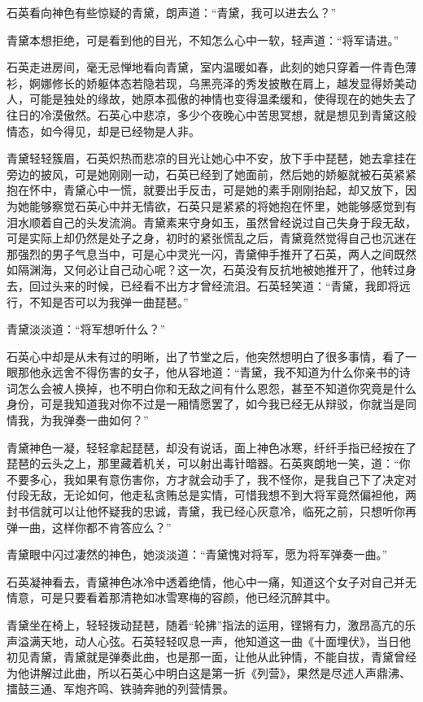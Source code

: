 石英看向神色有些惊疑的青黛，朗声道：“青黛，我可以进去么？”

青黛本想拒绝，可是看到他的目光，不知怎么心中一软，轻声道：“将军请进。”

石英走进房间，毫无忌惮地看向青黛，室内温暖如春，此刻的她只穿着一件青色薄衫，婀娜修长的娇躯体态若隐若现，乌黑亮泽的秀发披散在肩上，越发显得娇美动人，可能是独处的缘故，她原本孤傲的神情也变得温柔缓和，使得现在的她失去了往日的冷漠傲然。石英心中悲凉，多少个夜晚心中苦思冥想，就是想见到青黛这般情态，如今得见，却是已经物是人非。

青黛轻轻簇眉，石英炽热而悲凉的目光让她心中不安，放下手中琵琶，她去拿挂在旁边的披风，可是她刚刚一动，石英已经到了她面前，然后她的娇躯就被石英紧紧抱在怀中，青黛心中一慌，就要出手反击，可是她的素手刚刚抬起，却又放下，因为她能够察觉石英心中并无情欲，石英只是紧紧的将她抱在怀里，她能够感觉到有泪水顺着自己的头发流淌。青黛素来守身如玉，虽然曾经说过自己失身于段无敌，可是实际上却仍然是处子之身，初时的紧张慌乱之后，青黛竟然觉得自己也沉迷在那强烈的男子气息当中，可是心中灵光一闪，青黛伸手推开了石英，两人之间既然如隔渊海，又何必让自己动心呢？这一次，石英没有反抗地被她推开了，他转过身去，回过头来的时候，已经看不出方才曾经流泪。石英轻笑道：“青黛，我即将远行，不知是否可以为我弹一曲琵琶。”

青黛淡淡道：“将军想听什么？”

石英心中却是从未有过的明晰，出了节堂之后，他突然想明白了很多事情，看了一眼那他永远舍不得伤害的女子，他从容地道：“青黛，我不知道为什么你亲书的诗词怎么会被人换掉，也不明白你和无敌之间有什么恩怨，甚至不知道你究竟是什么身份，可是我知道我对你不过是一厢情愿罢了，如今我已经无从辩驳，你就当是同情我，为我弹奏一曲如何？”

青黛神色一凝，轻轻拿起琵琶，却没有说话，面上神色冰寒，纤纤手指已经按在了琵琶的云头之上，那里藏着机关，可以射出毒针暗器。石英爽朗地一笑，道：“你不要多心，我如果有意伤害你，方才就会动手了，我不怪你，是我自己下了决定对付段无敌，无论如何，他走私贪贿总是实情，可惜我想不到大将军竟然偏袒他，两封书信就可以让他怀疑我的忠诚，青黛，我已经心灰意冷，临死之前，只想听你再弹一曲，这样你都不肯答应么？”

青黛眼中闪过凄然的神色，她淡淡道：“青黛愧对将军，愿为将军弹奏一曲。”

石英凝神看去，青黛神色冰冷中透着绝情，他心中一痛，知道这个女子对自己并无情意，可是只要看着那清艳如冰雪寒梅的容颜，他已经沉醉其中。

青黛坐在椅上，轻轻拨动琵琶，随着“轮拂”指法的运用，铿锵有力，激昂高亢的乐声溢满天地，动人心弦。石英轻轻叹息一声，他知道这一曲《十面埋伏》，当日他初见青黛，青黛就是弹奏此曲，也是那一面，让他从此钟情，不能自拔，青黛曾经为他讲解过此曲，所以石英心中明白这是第一折《列营》，果然是尽述人声鼎沸、擂鼓三通、军炮齐鸣、铁骑奔驰的列营情景。

